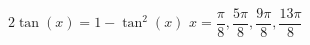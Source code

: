 { $2\tan(x) = 1 - \tan^{2}(x)$}
{ $x = \dfrac{\pi}{8}, \dfrac{5\pi}{8}, \dfrac{9\pi}{8}, \dfrac{13\pi}{8}$}
